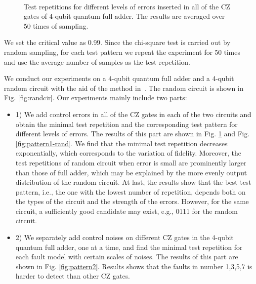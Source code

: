 \documentclass[conference, 9pt]{IEEEtran}
\begin{document}
\begin{figure}
    \\
    \caption{Test repetitions for different levels of errors inserted in all of the CZ gates of 4-qubit quantum full adder. The results are averaged over 50 times of sampling.}
    \label{fig:pattern1}
\end{figure}
We set the critical value as 0.99.
Since the chi-square test is carried out by random sampling, for each test pattern we repeat the experiment for 50 times and use the average number of samples as the test repetition. 

We conduct our experiments on a 4-qubit quantum full adder and a 4-qubit random circuit with the aid of the method in~\cite{fault_sim}. The random circuit is shown in Fig. \ref{fig:randcir}. Our experiments mainly include two parts:
\begin{itemize}
    \item 1) We add control errors in all of the CZ gates in each of the two circuits and obtain the minimal test repetition and the corresponding test pattern for different levels of errors. The results of this part are shown in Fig. \ref{fig:pattern1} and Fig. \ref{fig:pattern1-rand}. We find that the minimal test repetition decreases exponentially, which corresponds to the variation of fidelity. Moreover, the test repetitions of random circuit when error is small are prominently larger than those of full adder, which may be explained by the more evenly output distribution of the random circuit. At last, the results show that the best test pattern, i.e., the one with the lowest number of repetition, depends both on the types of the circuit and the strength of the errors. However, for the same circuit, a sufficiently good candidate may exist, e.g., 0111 for the random circuit. 
    
    \item 2) We separately add control noises on different CZ gates in the 4-qubit quantum full adder, one at a time, and find the minimal test repetition for each fault model with certain scales of noises. The results of this part are shown in Fig. \ref{fig:pattern2}. Results shows that the faults in number 1,3,5,7 is harder to detect than other CZ gates. 
\end{itemize}
\end{document}
